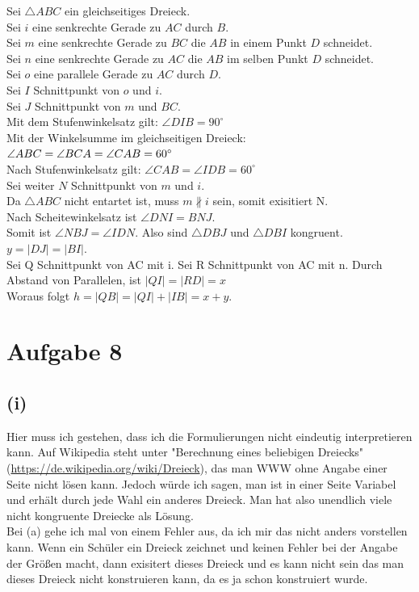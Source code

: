 \documentclass[12pt,a4paper]{article}
\begin{document}
\noindent Sei $\triangle ABC$ ein gleichseitiges Dreieck.\\
Sei $i$ eine senkrechte Gerade zu $AC$ durch $B$.\\ 
Sei $m$ eine senkrechte Gerade zu $BC$ die $AB$ in einem Punkt  $D$ schneidet.\\
Sei $n$ eine senkrechte Gerade zu $AC$ die $AB$ im selben Punkt $D$ schneidet.\\
Sei $o$ eine parallele Gerade zu $AC$ durch $D$.\\ 
Sei $I$ Schnittpunkt von $o$ und $i$.\\ 
Sei $J$ Schnittpunkt von $m$ und $BC$.\\ 
Mit dem Stufenwinkelsatz gilt: $\angle DIB = 90^\circ$\\ 
Mit der Winkelsumme im gleichseitigen Dreieck: \\ 
$\angle ABC = \angle BCA = \angle CAB = 60\degree$\\ 
Nach Stufenwinkelsatz gilt: $\angle CAB = \angle IDB = 60^\circ$\\ 
Sei weiter $N$ Schnittpunkt von $m$ und $i$.\\ 
Da $\triangle ABC$ nicht entartet ist, muss $m \nparallel i$ sein, somit exisitiert N.\\
Nach Scheitewinkelsatz ist $\angle DNI = BNJ$. \\
Somit ist $\angle NBJ = \angle IDN$. Also sind $\triangle DBJ$ und $\triangle DBI$ kongruent.\\
$y = |DJ| = |BI|$.\\
Sei Q Schnittpunkt von AC mit i.
Sei R Schnittpunkt von AC mit n.
Durch Abstand von Parallelen, ist $|QI| = |RD| = x$\\
Woraus folgt $h = |QB| = |QI| + |IB| = x + y$.

\section*{Aufgabe 8}
\subsection*{(i)}
Hier muss ich gestehen, dass ich die Formulierungen nicht eindeutig interpretieren kann. Auf Wikipedia steht unter "Berechnung eines beliebigen Dreiecks" (\url{https://de.wikipedia.org/wiki/Dreieck}), das man WWW ohne Angabe einer Seite nicht lösen kann. Jedoch würde ich sagen, man ist in einer Seite Variabel und erhält durch jede Wahl ein anderes Dreieck. Man hat also unendlich viele nicht kongruente Dreiecke als Lösung. \\
Bei (a) gehe ich mal von einem Fehler aus, da ich mir das nicht anders vorstellen kann. Wenn ein Schüler ein Dreieck zeichnet und keinen Fehler bei der Angabe der Größen macht, dann exisitert dieses Dreieck und es kann nicht sein das man dieses Dreieck nicht konstruieren kann, da es ja schon konstruiert wurde.\\
\end{document}
